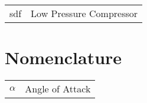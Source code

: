 {\renewcommand\arraystretch{1.0}
\begin{longtable*}{@{}l @{\quad - \quad} l@{}}

sdf & Low Pressure Compressor \\

\end{longtable*}}

\section*{Nomenclature}

\begin{flushleft}
{\renewcommand\arraystretch{1.0}
\begin{longtable*}{@{}l @{\quad - \quad} l@{}}

$\alpha$ & Angle of Attack \\       

\end{longtable*}}
\end{flushleft}